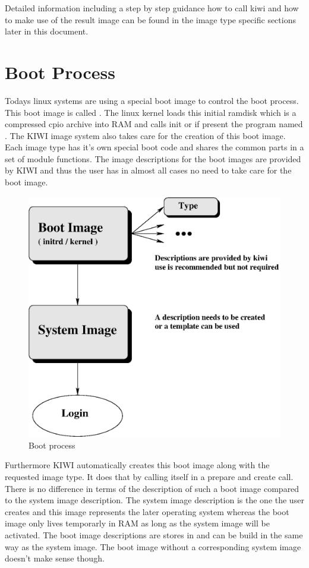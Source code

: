 Detailed information including a step by step guidance how to call
kiwi and how to make use of the result image can be found in the image
type specific sections later in this document.

\section{Boot Process}
Todays linux systems are using a special boot image to control the
boot process. This boot image is called . The linux
kernel loads this initial ramdisk which is a compressed cpio archive
into RAM and calls init or if present the program named . The
KIWI image system also takes care for the creation of this boot image.
Each image type has it's own special boot code and shares the common
parts in a set of module functions. The image descriptions for the
boot images are provided by KIWI and thus the user has in almost all
cases no need to take care for the boot image.

\begin{figure}[h]
\centering
\includegraphics[scale=0.5]{pictures/activation.eps}
\caption{Boot process}
\label{fig:initrd}
\end{figure}

Furthermore KIWI automatically creates this boot image along with
the requested image type. It does that by calling itself in a prepare
and create call. There is no difference in terms of the description
of such a boot image compared to the system image description. The
system image description is the one the user creates and this image
represents the later operating system whereas the boot image only
lives temporarly in RAM as long as the system image will be activated.
The boot image descriptions are stores in 
and can be build in the same way as the system image. The boot image
without a corresponding system image doesn't make sense though.

